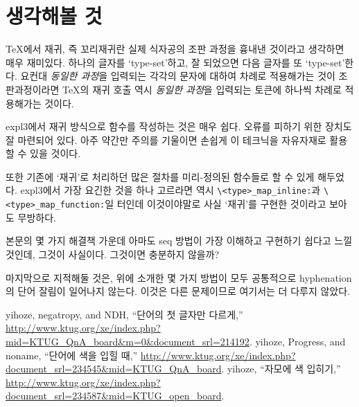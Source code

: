 \documentclass[a4paper]{oblivoir}
\begin{document}
\section{생각해볼 것}

\TeX 에서 재귀, 즉 꼬리재귀란 실제 식자공의 조판 과정을 흉내낸 것이라고 생각하면 매우 재미있다. 하나의 글자를 `type-set'하고, 잘 되었으면 다음 글자를 또 `type-set'한다. 요컨대 \emph{동일한 과정}을 입력되는 각각의 문자에 대하여 차례로 적용해가는 것이 조판과정이라면 \TeX 의 재귀 호출 역시 \emph{동일한 과정}을 입력되는 토큰에 하나씩 차례로 적용해가는 것이다.

expl3에서 재귀 방식으로 함수를 작성하는 것은 매우 쉽다. 오류를 피하기 위한 장치도 잘 마련되어 있다. 아주 약간만 주의를 기울이면 손쉽게 이 테크닉을 자유자재로 활용할 수 있을 것이다.

또한 기존에 `재귀'로 처리하던 많은 절차를 미리-정의된 함수들로 할 수 있게 해두었다. expl3에서 가장 요긴한 것을 하나 고르라면 역시 \verb|\<type>_map_inline:|과 \verb|\<type>_map_function:|일 터인데 이것이야말로 사실 `재귀'를 구현한 것이라고 보아도 무방하다.

\medskip

본문의 몇 가지 해결책 가운데 아마도 seq 방법이 가장 이해하고 구현하기 쉽다고 느낄 것인데, 그것이 사실이다. 그것이면 충분하지 않을까?

마지막으로 지적해둘 것은, 위에 소개한 몇 가지 방법이 모두 공통적으로 hyphenation의 단어 잘림이 일어나지 않는다. 이것은 다른 문제이므로 여기서는 더 다루지 않았다.



\renewcommand\bibname{참고 글}
\begin{thebibliography}{9}
 yihoze, negatropy, and NDH, ``단어의 첫 글자만 다르게,'' \url{http://www.ktug.org/xe/index.php?mid=KTUG_QnA_board&m=0&document_srl=214192}.
 yihoze, Progress, and noname, ``단어에 색을 입힐 때,'' \url{http://www.ktug.org/xe/index.php?document_srl=234545&mid=KTUG_QnA_board}.
 yihoze, ``자모에 색 입히기,'' \url{http://www.ktug.org/xe/index.php?document_srl=234587&mid=KTUG_open_board}.
\end{thebibliography}
\end{document}

